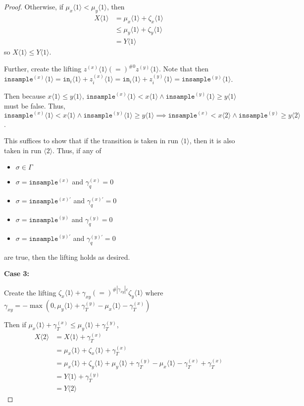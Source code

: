 \documentclass[12pt]{article}
\newcommand{\brangle}[1]{\langle #1 \rangle}
\theoremstyle{definition}
\begin{document}
\begin{proof}
    Otherwise, if $\mu_x\brangle{1}<\mu_y\brangle{1}$, then \begin{align*}
        X\brangle{1}&= \mu_x\brangle{1} + \zeta_x\brangle{1}\\
        &\leq \mu_y\brangle{1}+\zeta_y\brangle{1}\\
        &=Y\brangle{1}
    \end{align*}
    so $X\brangle{1}\leq Y\brangle{1}$.

    Further, create the lifting $z^{(x)}\brangle{1}(=)^{\#0}z^{(y)}\brangle{1}$. Note that then $\texttt{insample}^{(x)}\brangle{1}=\texttt{in}_i\brangle{1} + z_i^{(x)}\brangle{1} =\texttt{in}_i\brangle{1} + z_i^{(y)}\brangle{1}=\texttt{insample}^{(y)}\brangle{1}$.

    Then because $x\brangle{1} \leq y\brangle{1}$, $\texttt{insample}^{(x)}\brangle{1}<x\brangle{1}\land\texttt{insample}^{(y)}\brangle{1}\geq y\brangle{1}$ must be false. Thus, $\texttt{insample}^{(x)}\brangle{1}<x\brangle{1}\land\texttt{insample}^{(y)}\brangle{1}\geq y\brangle{1}\implies \texttt{insample}^{(x)}<x\brangle{2}\land\texttt{insample}^{(y)}\geq y\brangle{2}$.

    This suffices to show that if the transition is taken in run $\brangle{1}$, then it is also taken in run $\brangle{2}$. Thus, if any of \begin{itemize}
        \item $\sigma \in \Gamma$
        \item $\sigma = \texttt{insample}^{(x)}$ and $\gamma_q^{(x)}=0$ 
        \item $\sigma = \texttt{insample}^{(x)\prime}$ and $\gamma_q^{(x)\prime}=0$ 
        \item $\sigma = \texttt{insample}^{(y)}$ and $\gamma_q^{(y)}=0$
        \item $\sigma = \texttt{insample}^{(y)\prime}$ and $\gamma_q^{(y)\prime}=0$
    \end{itemize}
    are true, then the lifting holds as desired. 

    \textbf{Case 3:}
    
    Create the lifting $\zeta_x\brangle{1} + \gamma_{xy} (=)^{\#|\gamma_{xy}|\varepsilon} \zeta_y\brangle{1}$ where $\gamma_{xy} = -\max(0, \mu_y\brangle{1}+ \gamma_T^{(y)}-\mu_x\brangle{1}-\gamma_T^{(x)})$

    Then if $\mu_x\brangle{1}+\gamma_T^{(x)}\leq \mu_y\brangle{1}+\gamma_T^{(y)}$, \begin{align*}
        X\brangle{2} &= X\brangle{1} + \gamma_T^{(x)}\\
        &=\mu_x\brangle{1} + \zeta_x\brangle{1} + \gamma_T^{(x)}\\
        &=\mu_x\brangle{1} +\zeta_y\brangle{1} + \mu_y\brangle{1}+ \gamma_T^{(y)}-\mu_x\brangle{1}-\gamma_T^{(x)} +\gamma_T^{(x)}\\
        &=Y\brangle{1} + \gamma_T^{(y)}\\
        &= Y\brangle{2}
    \end{align*}


\end{proof}
\end{document}
